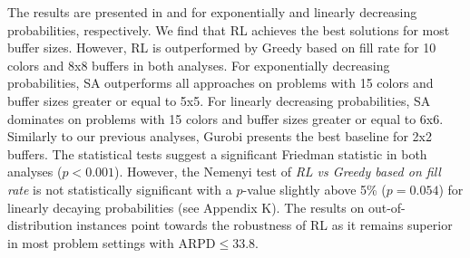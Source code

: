\documentclass[11pt]{elsarticle}
\newcommand{\blackversion}{ }
\newcommand{\blackorcolor}{
\ifdefined\blackversion
	\color{black}
\fi
}
\newcommand{\REV}[1]{{\color{myblue}\blackorcolor #1}}
\begin{document}
The results are presented in  and  for exponentially and linearly decreasing probabilities, respectively. We find that RL achieves the best solutions for most buffer sizes. However, RL is outperformed by Greedy based on fill rate for 10 colors and 8x8 buffers in both analyses. For exponentially decreasing probabilities, SA outperforms all approaches on problems with 15 colors and buffer sizes greater or equal to 5x5. For linearly decreasing probabilities, SA dominates on problems with 15 colors and buffer sizes greater or equal to 6x6. Similarly to our previous analyses, Gurobi presents the best baseline for 2x2 buffers. \REV{The statistical tests suggest a significant Friedman statistic in both analyses ($p < 0.001$). However, the Nemenyi test of \emph{RL vs Greedy based on fill rate} is not statistically significant with a $p$-value slightly above 5\% ($p=0.054$) for linearly decaying probabilities (see Appendix K).} The results on out-of-distribution instances point towards the robustness of RL as it remains superior in most problem settings with $\text{ARPD} \leq 33.8$.

\end{document}
